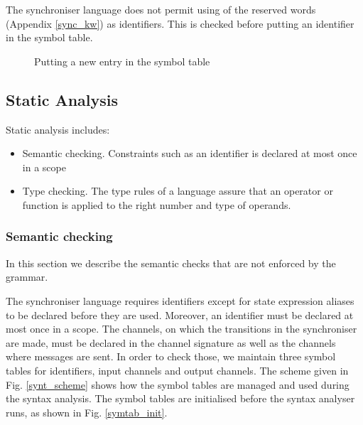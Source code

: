 The synchroniser language does not permit using of the reserved words (Appendix \ref{sync_kw}) as identifiers. This is checked before putting an identifier in the symbol table.

\begin{figure}[h!]
\noindent{}
\caption{Putting a new entry in the symbol table\label{symtab_put}}
\end{figure}






\subsection{Static Analysis}
Static analysis includes:
\begin{itemize}
\item Semantic checking. Constraints such as an identifier is declared at most once in a scope
\item Type checking. The type rules of a language assure that an operator or function is applied to the right number and type of operands.
\end{itemize}

  \subsubsection{Semantic checking}
In this section we describe the semantic checks that are not enforced by the grammar.

The synchroniser language requires identifiers except for state expression aliases to be declared before they are used. Moreover, an identifier must be declared at most once in a scope. The channels, on which the transitions in the synchroniser are made, must be declared in the channel signature as well as the channels where messages are sent. In order to check those, we maintain three symbol tables for identifiers, input channels and output channels. The scheme given in Fig. \ref{synt_scheme} shows how the symbol tables are managed and used during the syntax analysis. The symbol tables are initialised before the syntax analyser runs, as shown in Fig. \ref{symtab_init}.

